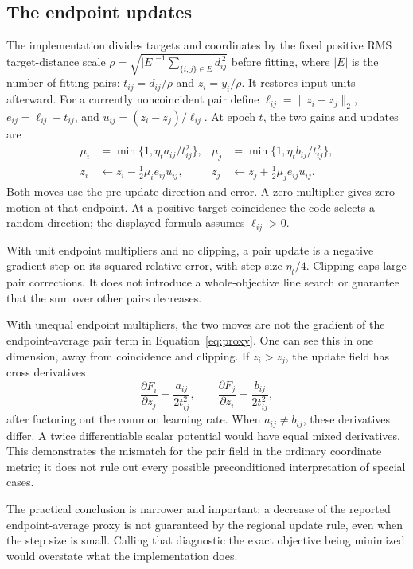 \documentclass[11pt]{article}
\begin{document}
\subsection{The endpoint updates}
The implementation divides targets and coordinates by the fixed positive
RMS target-distance scale
$\rho=\sqrt{|E|^{-1}\sum_{\{i,j\}\in E}d_{ij}^{\,2}}$ before fitting,
where $|E|$ is the number of fitting pairs:
$t_{ij}=d_{ij}/\rho$ and $z_i=y_i/\rho$. It restores input units afterward.
For a currently noncoincident pair define
$\ell_{ij}=\|z_i-z_j\|_2$, $e_{ij}=\ell_{ij}-t_{ij}$, and
$u_{ij}=(z_i-z_j)/\ell_{ij}$. At epoch $t$, the two gains and updates are
\begin{align}
\mu_i&=\min\{1,\eta_t a_{ij}/t_{ij}^2\},&
\mu_j&=\min\{1,\eta_t b_{ij}/t_{ij}^2\},\\
z_i&\leftarrow z_i-\tfrac12\mu_i e_{ij}u_{ij},&
z_j&\leftarrow z_j+\tfrac12\mu_j e_{ij}u_{ij}.
\end{align}
Both moves use the pre-update direction and error. A zero multiplier gives
zero motion at that endpoint. At a positive-target coincidence the code
selects a random direction; the displayed formula assumes $\ell_{ij}>0$.

With unit endpoint multipliers and no clipping, a pair update is a negative
gradient step on its squared relative error, with step size $\eta_t/4$.
Clipping caps large pair corrections. It does not introduce a whole-objective
line search or guarantee that the sum over other pairs decreases.

With unequal endpoint multipliers, the two moves are not the gradient of the
endpoint-average pair term in Equation~\eqref{eq:proxy}. One can see this in
one dimension, away from coincidence and clipping. If $z_i>z_j$, the update
field has cross derivatives
\begin{equation}
\frac{\partial F_i}{\partial z_j}
 =\frac{a_{ij}}{2t_{ij}^2},\qquad
\frac{\partial F_j}{\partial z_i}
 =\frac{b_{ij}}{2t_{ij}^2},
\end{equation}
after factoring out the common learning rate. When $a_{ij}\ne b_{ij}$,
these derivatives differ. A twice differentiable scalar potential would
have equal mixed derivatives. This demonstrates the mismatch for the
pair field in the ordinary coordinate metric; it does not rule out every
possible preconditioned interpretation of special cases.

The practical conclusion is narrower and important: a decrease of the
reported endpoint-average proxy is not guaranteed by the regional update
rule, even when the step size is small. Calling that diagnostic the exact
objective being minimized would overstate what the implementation does.
\end{document}
